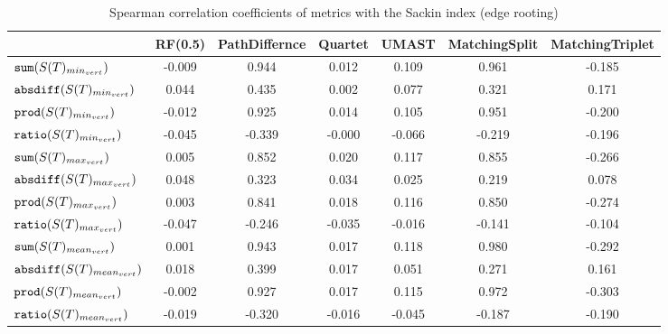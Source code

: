 \begin{table}[h]
\centering
\caption{Spearman correlation coefficients of metrics with the Sackin index (edge rooting)}
\begin{tabular}{lcccccc}
 & RF(0.5) & PathDiffernce & Quartet & UMAST & MatchingSplit & MatchingTriplet \\
\hline
${\verb+sum+}(S(T)_{min_{vert}})$ & -0.009 & 0.944 & 0.012 & 0.109 & 0.961 & -0.185 \\
${\verb+absdiff+}(S(T)_{min_{vert}})$ & 0.044 & 0.435 & 0.002 & 0.077 & 0.321 & 0.171 \\
${\verb+prod+}(S(T)_{min_{vert}})$ & -0.012 & 0.925 & 0.014 & 0.105 & 0.951 & -0.200 \\
${\verb+ratio+}(S(T)_{min_{vert}})$ & -0.045 & -0.339 & -0.000 & -0.066 & -0.219 & -0.196 \\
${\verb+sum+}(S(T)_{max_{vert}})$ & 0.005 & 0.852 & 0.020 & 0.117 & 0.855 & -0.266 \\
${\verb+absdiff+}(S(T)_{max_{vert}})$ & 0.048 & 0.323 & 0.034 & 0.025 & 0.219 & 0.078 \\
${\verb+prod+}(S(T)_{max_{vert}})$ & 0.003 & 0.841 & 0.018 & 0.116 & 0.850 & -0.274 \\
${\verb+ratio+}(S(T)_{max_{vert}})$ & -0.047 & -0.246 & -0.035 & -0.016 & -0.141 & -0.104 \\
${\verb+sum+}(S(T)_{mean_{vert}})$ & 0.001 & 0.943 & 0.017 & 0.118 & 0.980 & -0.292 \\
${\verb+absdiff+}(S(T)_{mean_{vert}})$ & 0.018 & 0.399 & 0.017 & 0.051 & 0.271 & 0.161 \\
${\verb+prod+}(S(T)_{mean_{vert}})$ & -0.002 & 0.927 & 0.017 & 0.115 & 0.972 & -0.303 \\
${\verb+ratio+}(S(T)_{mean_{vert}})$ & -0.019 & -0.320 & -0.016 & -0.045 & -0.187 & -0.190 \\
\end{tabular}
\end{table}

